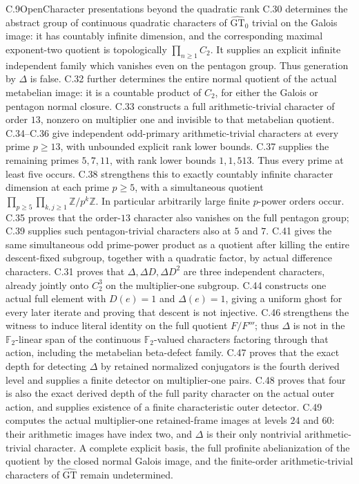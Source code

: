 \begin{statement}{C.9}{Open}{Character presentations beyond the quadratic rank}
C.30 determines the abstract group of continuous quadratic characters of
$\widehat{\mathrm{GT}}_0$ trivial on the Galois image: it has countably
infinite dimension, and the corresponding maximal exponent-two quotient
is topologically $\prod_{n\geq1}C_2$. It supplies an explicit infinite
independent family which vanishes even on the pentagon group. Thus
generation by $\Delta$ is false. C.32 further determines the entire
normal quotient of the actual metabelian image: it is a countable
product of $C_2$, for either the Galois or pentagon normal closure.
C.33 constructs a full arithmetic-trivial character of order
$13$, nonzero on multiplier one and invisible to that metabelian
quotient.
C.34--C.36 give independent odd-primary arithmetic-trivial
characters at every prime $p\geq13$, with unbounded explicit
rank lower bounds.
C.37 supplies the remaining primes $5,7,11$, with rank
lower bounds $1,1,513$.  Thus every prime at least five occurs.
C.38 strengthens this to exactly countably infinite character
dimension at each prime $p\geq5$, with a simultaneous quotient
$\prod_{p\geq5}\prod_{k,j\geq1}\mathbb Z/p^k\mathbb Z$.
In particular arbitrarily large finite $p$-power orders occur.
C.35 proves that the order-$13$ character also vanishes on the
full pentagon group; C.39 supplies such pentagon-trivial
characters also at $5$ and $7$.
C.41 gives the same simultaneous odd prime-power product as a
quotient after killing the entire descent-fixed subgroup, together
with a quadratic factor, by actual difference characters.
C.31 proves that $\Delta,\Delta D,\Delta D^2$ are three
independent characters, already jointly onto $C_2^3$ on the
multiplier-one subgroup.
C.44 constructs one actual full element with $D(e)=1$ and
$\Delta(e)=1$, giving a uniform ghost for every later iterate
and proving that descent is not injective. C.46 strengthens the
witness to induce literal identity on the full quotient $F/F'''$;
thus $\Delta$ is not in the $\mathbb F_2$-linear span of the
continuous $\mathbb F_2$-valued characters factoring through that
action, including the metabelian beta-defect family. C.47 proves that
the exact depth for detecting $\Delta$ by retained normalized
conjugators is the fourth derived level and supplies a finite detector
on multiplier-one pairs. C.48 proves that four is also the exact
derived depth of the full parity character on the actual outer action,
and supplies existence of a finite characteristic outer detector.
C.49 computes the actual multiplier-one retained-frame images at
levels $24$ and $60$: their arithmetic images have index two, and
$\Delta$ is their only nontrivial arithmetic-trivial character.
A complete explicit basis, the full profinite abelianization of the quotient by the closed normal Galois
image, and the finite-order arithmetic-trivial characters of
$\widehat{\mathrm{GT}}$ remain undetermined.
\end{statement}

